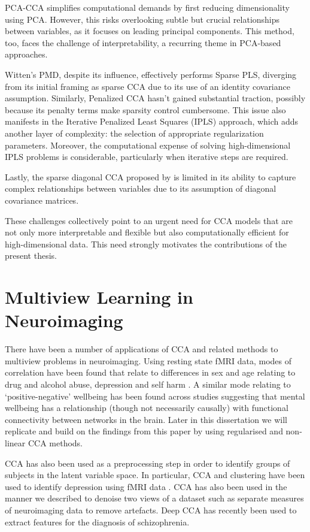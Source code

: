 PCA-CCA simplifies computational demands by first reducing dimensionality using PCA. However, this risks overlooking subtle but crucial relationships between variables, as it focuses on leading principal components.
This method, too, faces the challenge of interpretability, a recurring theme in PCA-based approaches.

Witten's PMD, despite its influence, effectively performs Sparse PLS, diverging from its initial framing as sparse CCA due to its use of an identity covariance assumption.
Similarly, Penalized CCA \cite{parkhomenko2009sparse} hasn't gained substantial traction, possibly because its penalty terms make sparsity control cumbersome.
This issue also manifests in the Iterative Penalized Least Squares (IPLS) approach, which adds another layer of complexity: the selection of appropriate regularization parameters.
Moreover, the computational expense of solving high-dimensional IPLS problems is considerable, particularly when iterative steps are required.

Lastly, the sparse diagonal CCA proposed by \cite{asteris2016simple} is limited in its ability to capture complex relationships between variables due to its assumption of diagonal covariance matrices.

These challenges collectively point to an urgent need for CCA models that are not only more interpretable and flexible but also computationally efficient for high-dimensional data.
This need strongly motivates the contributions of the present thesis.


\section{Multiview Learning in Neuroimaging}

There have been a number of applications of CCA and related methods to multiview problems in neuroimaging.
Using resting state fMRI data, modes of correlation have been found that relate to differences in sex and age relating to drug and alcohol abuse, depression and self harm \cite{mihalik2019brain}.
A similar mode relating to `positive-negative' wellbeing has been found across studies \cite{smith2015positive}suggesting that mental wellbeing has a relationship (though not necessarily causally) with functional connectivity between networks in the brain.
Later in this dissertation we will replicate and build on the findings from this paper by using regularised and non-linear CCA methods.

CCA has also been used as a preprocessing step in order to identify groups of subjects in the latent variable space.
In particular, CCA and clustering have been used to identify depression using fMRI data\cite{dinga2019evaluating} \cite{drysdale2017resting}.
CCA has also been used in the manner we described to denoise two views of a dataset such as separate measures of neuroimaging data \cite{zhuang2020technical} to remove artefacts.
Deep CCA has recently been used to extract features for the diagnosis of schizophrenia\cite{qi2016deep}.






